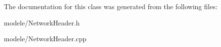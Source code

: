 

The documentation for this class was generated from the following files\-:\begin{DoxyCompactItemize}
\item 
modele/Network\-Header.\-h\item 
modele/Network\-Header.\-cpp\end{DoxyCompactItemize}
